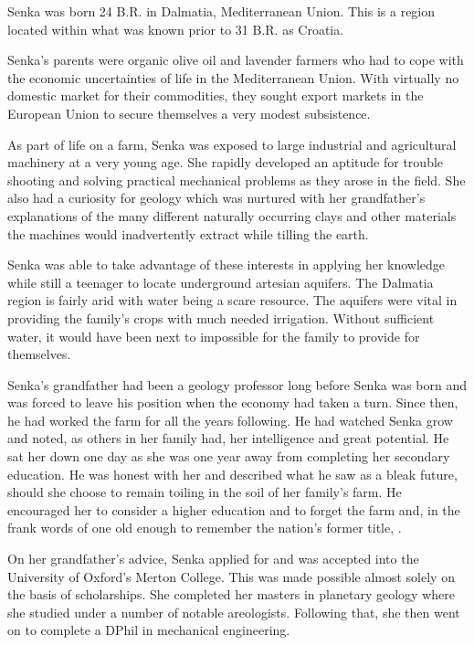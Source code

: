 

Senka was born 24 B.R. in Dalmatia, Mediterranean Union. This is a region located within what was known prior to 31 B.R. as Croatia. 

Senka's parents were organic olive oil and lavender farmers who had to cope with the economic uncertainties of life in the Mediterranean Union. With virtually no domestic market for their commodities, they sought export markets in the European Union to secure themselves a very modest subsistence.

As part of life on a farm, Senka was exposed to large industrial and agricultural machinery at a very young age. She rapidly developed an aptitude for trouble shooting and solving practical mechanical problems as they arose in the field. She also had a curiosity for geology which was nurtured with her grandfather's explanations of the many different naturally occurring clays and other materials the machines would inadvertently extract while tilling the earth. 

Senka was able to take advantage of these interests in applying her knowledge while still a teenager to locate underground artesian aquifers. The Dalmatia region is fairly arid with water being a scare resource. The aquifers were vital in providing the family's crops with much needed irrigation. Without sufficient water, it would have been next to impossible for the family to provide for themselves.

Senka's grandfather had been a geology professor long before Senka was born and was forced to leave his position when the economy had taken a turn. Since then, he had worked the farm for all the years following. He had watched Senka grow and noted, as others in her family had, her intelligence and great potential. He sat her down one day as she was one year away from completing her secondary education. He was honest with her and described what he saw as a bleak future, should she choose to remain toiling in the soil of her family's farm. He encouraged her to consider a higher education and to forget the farm and, in the frank words of one old enough to remember the nation's former title, .

On her grandfather's advice, Senka applied for and was accepted into the University of Oxford's Merton College. This was made possible almost solely on the basis of scholarships. She completed her masters in planetary geology where she studied under a number of notable areologists. Following that, she then went on to complete a DPhil in mechanical engineering.

